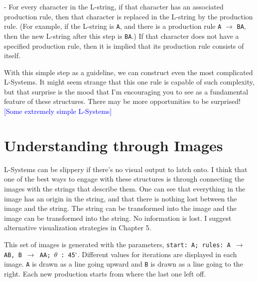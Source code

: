 \documentclass[12pt,twoside]{reedthesis}
\newcommand{\code}[1]{\texttt{#1}}
\begin{document}
	\begin{addmargin}[4em]{4em}
	- For every character in the L-string, if that character has an associated production rule, then that character is replaced in the L-string by the production rule. (For example, if the L-string is \code{A}, and there is a production rule \code{A} $\rightarrow$ \code{BA}, then the new L-string after this step is \code{BA}.) If that character does not have a specified production rule, then it is implied that its production rule consists of itself.\\
	 \end{addmargin}
	 
	 With this simple step as a guideline, we can construct even the most complicated L-Systems. It might seem strange that this one rule is capable of such complexity, but that surprise is the mood that I'm encouraging you to see as a fundamental feature of these structures. There may be more opportunities to be surprised!\\

	\textcolor{blue}{[Some extremely simple L-Systems]}\\

\section{Understanding through Images}
\label{Understanding-through-Images}

	L-Systems can be slippery if there's no visual output to latch onto. I think that one of the best ways to engage with these structures is through connecting the images with the strings that describe them. One can see that everything in the image has an origin in the string, and that there is nothing lost between the image and the string. The string can be transformed into the image and the image can be transformed into the string. No information is lost. I suggest alternative visualization strategies in Chapter 5.

This set of images is generated with the parameters, \code{start: A; rules: A $\rightarrow$ AB, B $\rightarrow$ AA; $\theta$ : 45$^{\circ}$}. Different values for iterations are displayed in each image. \code{A} is drawn as a line going upward and \code{B} is drawn as a line going to the right. Each new production starts from where the last one left off.\\
\end{document}
